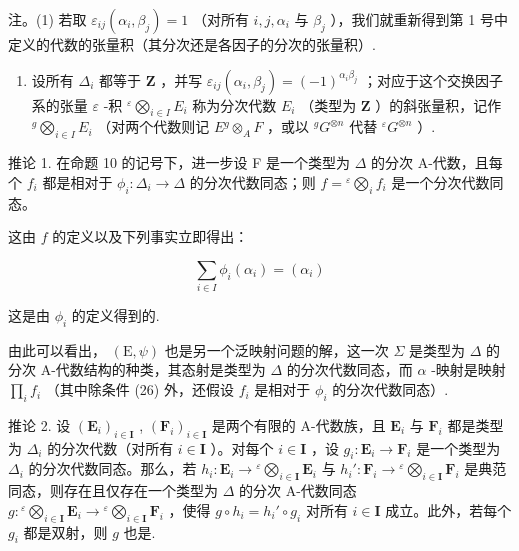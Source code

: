 注。(1) 若取 \(\varepsilon_{ij}(\alpha_i, \beta_j) = 1\) （对所有 \(i, j, \alpha_i\) 与 \(\beta_j\) ），我们就重新得到第 1 号中定义的代数的张量积（其分次还是各因子的分次的张量积）.

\begin{enumerate}
\def\labelenumi{(\arabic{enumi})}
\setcounter{enumi}{1}
\tightlist
\item
  设所有 \(\Delta_{i}\) 都等于 \(\mathbf{Z}\) ，并写 \(\varepsilon_{ij}(\alpha_i, \beta_j) = (-1)^{\alpha_i \beta_j}\) ；对应于这个交换因子系的张量 \(\varepsilon\) -积 \({}^{\varepsilon}\bigotimes_{i \in I} E_i\) 称为分次代数 \(E_i\) （类型为 \(\mathbf{Z}\) ）的斜张量积，记作 \({}^{g}\bigotimes_{i \in I} E_i\) （对两个代数则记 \(E{}^{g} \otimes_A F\) ，或以 \({}^{g} G^{\otimes n}\) 代替 \({}^{\varepsilon} G^{\otimes n}\) ）.
\end{enumerate}

推论 1. 在命题 10 的记号下，进一步设 F 是一个类型为 \(\Delta\) 的分次 A-代数，且每个 \(f_{i}\) 都是相对于 \(\phi_{i}:\Delta_{i}\to\Delta\) 的分次代数同态；则 \(f={}^{\varepsilon}\bigotimes_{i}f_{i}\) 是一个分次代数同态。

这由 \(f\) 的定义以及下列事实立即得出：

\[
\sum_ {i \in I} \phi_ {i} (\alpha_ {i}) = (\alpha_ {i})
\]

这是由 \(\phi_{i}\) 的定义得到的.

由此可以看出， \((\mathrm{E},\psi)\) 也是另一个泛映射问题的解，这一次 \(\Sigma\) 是类型为 \(\Delta\) 的分次 A-代数结构的种类，其态射是类型为 \(\Delta\) 的分次代数同态，而 \(\alpha\) -映射是映射 \(\prod_{i}f_{i}\) （其中除条件 (26) 外，还假设 \(f_{i}\) 是相对于 \(\phi_{i}\) 的分次代数同态）.

推论 2. 设 \((\mathbf{E}_i)_{i\in \mathbf{I}}\) , \((\mathbf{F}_i)_{i\in \mathbf{I}}\) 是两个有限的 A-代数族，且 \(\mathbf{E}_i\) 与 \(\mathbf{F}_i\) 都是类型为 \(\Delta_i\) 的分次代数（对所有 \(i\in \mathbf{I}\) ）。对每个 \(i\in \mathbf{I}\) ，设 \(g_i:\mathbf{E}_i\to \mathbf{F}_i\) 是一个类型为 \(\Delta_i\) 的分次代数同态。那么，若 \(h_i:\mathbf{E}_i\to {}^{\varepsilon}\bigotimes_{i\in \mathbf{I}}\mathbf{E}_i\) 与 \(h_i':\mathbf{F}_i\to {}^{\varepsilon}\bigotimes_{i\in \mathbf{I}}\mathbf{F}_i\) 是典范同态，则存在且仅存在一个类型为 \(\Delta\) 的分次 A-代数同态 \(g: {}^{\varepsilon}\bigotimes_{i\in \mathbf{I}}\mathbf{E}_i\to {}^{\varepsilon}\bigotimes_{i\in \mathbf{I}}\mathbf{F}_i\) ，使得 \(g\circ h_i = h_i'\circ g_i\) 对所有 \(i\in \mathbf{I}\) 成立。此外，若每个 \(g_i\) 都是双射，则 \(g\) 也是.

